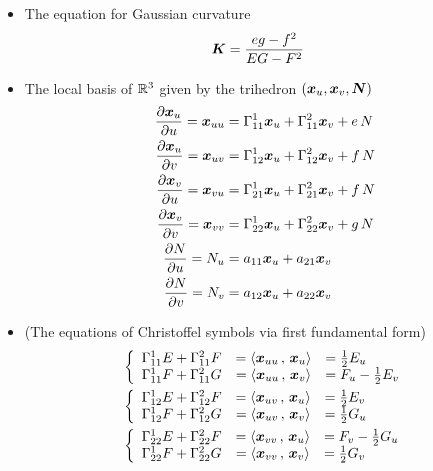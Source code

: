\documentclass[11pt]{article}
\begin{document}
\begin{itemize}
\item The equation for Gaussian curvature 
\begin{align}
\boldsymbol{K} &=  \frac{eg- f^{2}}{EG- F^{2}} \label{eqn: Gaussian_curvature}
\end{align} \vspace{10pt}



\item The local basis of ${\mathbb R}^{3}$ given by the trihedron  $(\boldsymbol{x}_{u}, \boldsymbol{x}_{v}, \boldsymbol{N})$ 
\begin{align}
\frac{\partial \boldsymbol{x}_{u}}{ \partial u} = \boldsymbol{x}_{uu} &= \Gamma_{11}^{1}\boldsymbol{x}_{u} +  \Gamma_{11}^{2}\boldsymbol{x}_{v} + e\,N\nonumber\\
\frac{\partial \boldsymbol{x}_{u}}{ \partial v} = \boldsymbol{x}_{uv} &= \Gamma_{12}^{1}\boldsymbol{x}_{u} +  \Gamma_{12}^{2}\boldsymbol{x}_{v} + f\,N\nonumber\\
\frac{\partial \boldsymbol{x}_{v}}{ \partial u} = \boldsymbol{x}_{vu} &= \Gamma_{21}^{1}\boldsymbol{x}_{u} +  \Gamma_{21}^{2}\boldsymbol{x}_{v} + f\,N\nonumber\\
\frac{\partial \boldsymbol{x}_{v}}{ \partial v} = \boldsymbol{x}_{vv} &= \Gamma_{22}^{1}\boldsymbol{x}_{u} +  \Gamma_{22}^{2}\boldsymbol{x}_{v} + g\,N\nonumber\\
\frac{\partial N}{ \partial u} =N_{u} &= a_{11}\boldsymbol{x}_{u} +  a_{21}\boldsymbol{x}_{v} \nonumber\\
\frac{\partial N}{ \partial v} =N_{v} &= a_{12}\boldsymbol{x}_{u} +  a_{22}\boldsymbol{x}_{v} \label{eqn: Christoffel_eq_1}
\end{align}


\item (The equations of Christoffel symbols via first fundamental form)\\
\begin{align}
&\left\{ \begin{array}{ccl}
\Gamma_{11}^{1}E + \Gamma_{11}^{2}F &= \left\langle \boldsymbol{x}_{uu}\,,\, \boldsymbol{x}_{u} \right\rangle &= \frac{1}{2}E_{u} \\ 
\Gamma_{11}^{1}F + \Gamma_{11}^{2}G &= \left\langle \boldsymbol{x}_{uu}\,,\, \boldsymbol{x}_{v} \right\rangle &= F_{u} - \frac{1}{2}E_{v} 
\end{array} \right. \nonumber\\
&\left\{ \begin{array}{ccl}
\Gamma_{12}^{1}E + \Gamma_{12}^{2}F &= \left\langle \boldsymbol{x}_{uv}\,,\, \boldsymbol{x}_{u} \right\rangle &= \frac{1}{2}E_{v} \\ 
\Gamma_{12}^{1}F + \Gamma_{12}^{2}G &= \left\langle \boldsymbol{x}_{uv}\,,\, \boldsymbol{x}_{v} \right\rangle &= \frac{1}{2}G_{u}  
\end{array} \right. \nonumber\\
&\left\{ \begin{array}{ccl}
\Gamma_{22}^{1}E + \Gamma_{22}^{2}F &= \left\langle \boldsymbol{x}_{vv}\,,\, \boldsymbol{x}_{u} \right\rangle &=F_{v} - \frac{1}{2}G_{u}  \\ 
\Gamma_{22}^{1}F + \Gamma_{22}^{2}G &= \left\langle \boldsymbol{x}_{vv}\,,\, \boldsymbol{x}_{v} \right\rangle &= \frac{1}{2}G_{v}   
\end{array} \right. \label{eqn: Christoffel_eq_2}
\end{align}




\end{itemize}
\end{document}
